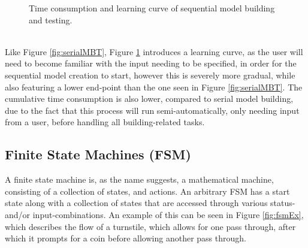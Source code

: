 \begin{description}
\begin{figure}[h]
		\caption{Time consumption and learning curve of sequential model building and testing.}
		\label{fig:sequenceMBT}
	\end{figure}\\
	Like Figure \ref{fig:serialMBT}, Figure \ref{fig:sequenceMBT} introduces a learning curve, as the user will need to become familiar with the input needing to be specified, in order for the sequential model creation to start, however this is severely more gradual, while also featuring a lower end-point than the one seen in Figure \ref{fig:serialMBT}. The cumulative time consumption is also lower, compared to serial model building, due to the fact that this process will run semi-automatically, only needing input from a user, before handling all building-related tasks.
\end{description}
\newpage
\subsection{Finite State Machines (FSM)}
A finite state machine is, as the name suggests, a mathematical machine, consisting of a collection of states, and actions. An arbitrary FSM has a start state along with a collection of states that are accessed through various status- and/or input-combinations. An example of this can be seen in Figure \ref{fig:fsmEx}, which describes the flow of a turnstile, which allows for one pass through, after which it prompts for a coin before allowing another pass through.

